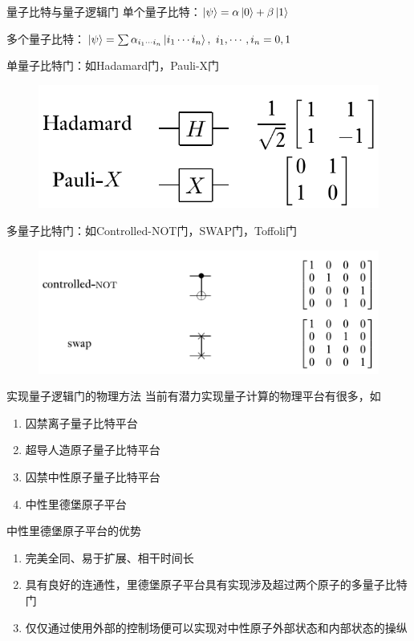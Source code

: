 \documentclass[10pt,aspectratio=43]{beamer}
\begin{document}
\begin{frame}{量子比特与量子逻辑门}
单个量子比特：$ \ket{\psi}=\alpha\ket{0}+\beta\ket{1} $

多个量子比特：$ \ket{\psi}=\sum\alpha_{i_1\cdots i_n}\ket{i_1\cdots i_n},~i_1,\cdots,i_n=0,1 $

单量子比特门：如Hadamard门，Pauli-X门
\begin{figure}
\centering
\includegraphics[scale=0.25]{gate1}
\label{fig:gate1}
\end{figure}

多量子比特门：如Controlled-NOT门，SWAP门，Toffoli门
\begin{figure}
\centering
\includegraphics[scale=0.25]{gaten}
\label{fig:gaten}
\end{figure}
\end{frame}

\begin{frame}{实现量子逻辑门的物理方法}
当前有潜力实现量子计算的物理平台有很多，如
\begin{enumerate}
\item 囚禁离子量子比特平台
\item 超导人造原子量子比特平台
\item 囚禁中性原子量子比特平台
\item 中性里德堡原子平台
\end{enumerate}
中性里德堡原子平台的优势
\begin{enumerate}
\item 完美全同、易于扩展、相干时间长
\item 具有良好的连通性，里德堡原子平台具有实现涉及超过两个原子的多量子比特门
\item 仅仅通过使用外部的控制场便可以实现对中性原子外部状态和内部状态的操纵
\end{enumerate}
\end{frame}
\end{document}
